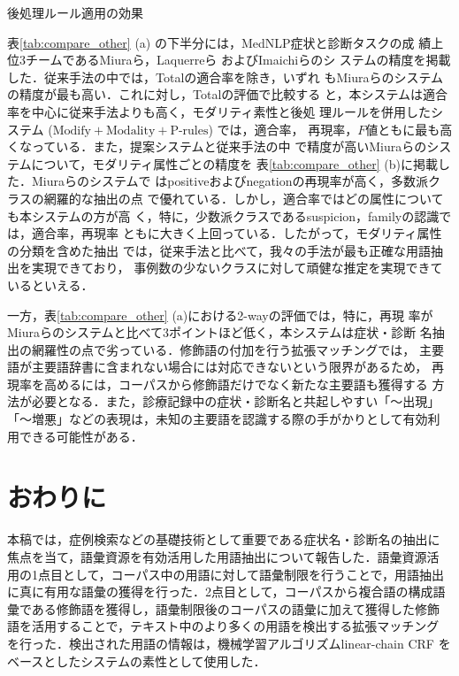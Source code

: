 \documentclass[japanese]{jnlp_1.4}
\begin{document}
\begin{table}[b]
 \caption{後処理ルール適用の効果}
\label{tab:prules_effect}

\end{table}

表\ref{tab:compare_other} (a) の下半分には，MedNLP症状と診断タスクの成
績上位3チームであるMiuraら\cite{miura2013incorporating}，Laquerreら
\cite{laquerre2013necla}およびImaichiら\cite{imaichi2013comparison}のシ
ステムの精度を掲載した．従来手法の中では，Totalの適合率を除き，いずれ
もMiuraらのシステムの精度が最も高い．これに対し，Totalの評価で比較する
と，本システムは適合率を中心に従来手法よりも高く，モダリティ素性と後処
理ルールを併用したシステム ($\text{Modify} + \text{Modality} + \text{P-rules}$) では，適合率，
再現率，$F$値ともに最も高くなっている．また，提案システムと従来手法の中
で精度が高いMiuraらのシステムについて，モダリティ属性ごとの精度を
表\ref{tab:compare_other} (b)に掲載した．Miuraらのシステムで
はpositiveおよびnegationの再現率が高く，多数派クラスの網羅的な抽出の点
で優れている．しかし，適合率ではどの属性についても本システムの方が高
く，特に，少数派クラスであるsuspicion，familyの認識では，適合率，再現率
ともに大きく上回っている．したがって，モダリティ属性の分類を含めた抽出
では，従来手法と比べて，我々の手法が最も正確な用語抽出を実現できており，
事例数の少ないクラスに対して頑健な推定を実現できているといえる．

一方，表\ref{tab:compare_other} (a)における2-wayの評価では，特に，再現
率がMiuraらのシステムと比べて3ポイントほど低く，本システムは症状・診断
名抽出の網羅性の点で劣っている．修飾語の付加を行う拡張マッチングでは，
主要語が主要語辞書に含まれない場合には対応できないという限界があるため，
再現率を高めるには，コーパスから修飾語だけでなく新たな主要語も獲得する
方法が必要となる．また，診療記録中の症状・診断名と共起しやすい「〜出現」
「〜増悪」などの表現は，未知の主要語を認識する際の手がかりとして有効利
用できる可能性がある．


\section{おわりに}
\label{chp:conclusions}

本稿では，症例検索などの基礎技術として重要である症状名・診断名の抽出に
焦点を当て，語彙資源を有効活用した用語抽出について報告した．語彙資源活
用の1点目として，コーパス中の用語に対して語彙制限を行うことで，用語抽出
に真に有用な語彙の獲得を行った．2点目として，コーパスから複合語の構成語
彙である修飾語を獲得し，語彙制限後のコーパスの語彙に加えて獲得した修飾
語を活用することで，テキスト中のより多くの用語を検出する拡張マッチング
を行った．検出された用語の情報は，機械学習アルゴリズムlinear-chain CRF
をベースとしたシステムの素性として使用した．
\end{document}
